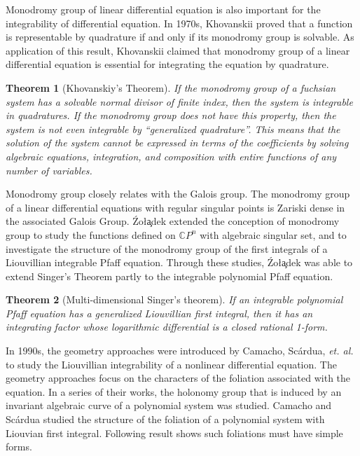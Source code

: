 \documentclass[preprint, 12pt]{elsarticle}
\newtheorem{thm}{Theorem}[section]
\numberwithin{equation}{section}
\newcommand{\Comp}{\mathbb{C}}
\begin{document}
Monodromy group of linear differential equation is also important for the integrability of differential equation. In 1970s, Khovanskii proved
that a function is representable by quadrature if and only if its
monodromy group is solvable\cite{Kh:95}. As application of this result, Khovanskii claimed that monodromy group of a linear differential equation is essential for
integrating the equation by quadrature\cite[pp. 128-130,
Khovanskiy's Theorem]{Yu:88}. 

\begin{thm}[Khovanskiy's Theorem]\cite{Yu:88}
If the monodromy group of  a fuchsian system has a solvable normal divisor of finite index, then the system is integrable in quadratures. If the monodromy group does not have this property, then the system is not even integrable by ``generalized quadrature''. This means that the solution of the system cannot be expressed in terms of the coefficients by solving algebraic equations, integration, and composition with entire functions of any number of variables.
\end{thm}

Monodromy group closely relates with the Galois group. The monodromy group of a linear differential equations with regular singular points is Zariski dense in the associated Galois Group\cite{Sch:1887}. \'{Z}o\l\c{a}dek extended the conception of monodromy group  to study the functions defined on $\Comp P^n$ with algebraic
singular set, and to investigate the structure of the monodromy group of the first integrals of a Liouvillian integrable Pfaff equation\cite{Z:98-1}.  Through these studies, \'{Z}o\l\c{a}dek was able to extend Singer's Theorem partly to the integrable
polynomial Pfaff equation\cite{Z:98-1}.

\begin{thm}[Multi-dimensional Singer's theorem] \cite{Z:98-1}
If an integrable polynomial Pfaff equation has a generalized Liouvillian first integral, then it has an integrating factor whose logarithmic differential is a closed rational 1-form.
\end{thm}

In 1990s, the geometry approaches were introduced by
Camacho, Sc\'{a}rdua, \textit{et. al.} to study the Liouvillian
integrability of a nonlinear differential equation. The geometry approaches focus on the 
characters of the foliation associated with the equation. In a series of their works,
the holonomy group that is induced by an invariant algebraic curve of
a polynomial system was studied\cite{Ca:00,Ca:01,Ce:98}. 
Camacho and Sc\'{a}rdua studied the structure of the foliation of a polynomial system with Liouvian first integral. Following result shows such foliations must have simple forms.
\end{document}
